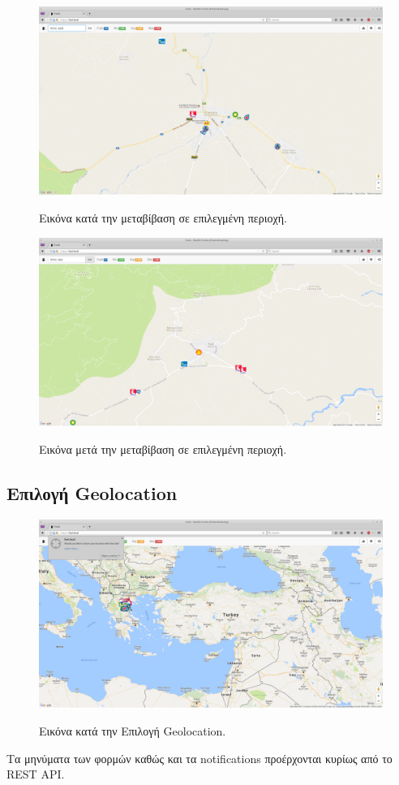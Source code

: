 \begin{figure}[H]
  \caption{Εικόνα κατά την μεταβίβαση σε επιλεγμένη περιοχή.}
  \centering
    \includegraphics[width=1\textwidth]{img/area.png}
    \label{fig:area}
\end{figure}

\begin{figure}[H]
  \caption{Εικόνα μετά την μεταβίβαση σε επιλεγμένη περιοχή.}
  \centering
    \includegraphics[width=1\textwidth]{img/area-after.png}
    \label{fig:area-after}
\end{figure}

\subsection{Επιλογή Geolocation}

\begin{figure}[H]
  \caption{Εικόνα κατά την Επιλογή Geolocation.}
  \centering
    \includegraphics[width=1\textwidth]{img/geolocation.png}
    \label{fig:geolocation}
\end{figure}

Τα μηνύματα των φορμών καθώς και τα notifications προέρχονται κυρίως από το REST API.